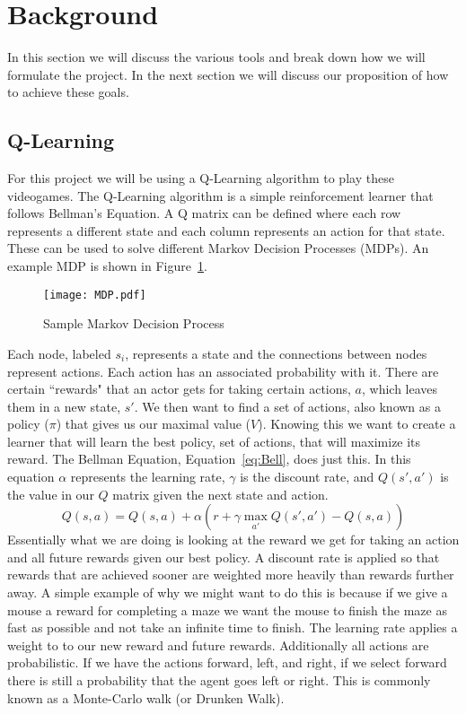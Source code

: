 \section{Background}
In this section we will discuss the various tools and break down how we will
formulate the project. In the next section we will discuss our proposition of
how to achieve these goals.

\subsection{Q-Learning}
For this project we will be using a Q-Learning algorithm to play these
videogames. The Q-Learning algorithm is a simple reinforcement learner that
follows Bellman's Equation. A Q matrix can be defined where each row represents
a different state and each column represents an action for that state. These
can be used to solve different Markov Decision Processes (MDPs). An example
MDP is shown in Figure~\ref{fig:MDP}.

\begin{figure}[ht]
    \centering
    \texttt{[image: MDP.pdf]}
\caption{Sample Markov Decision Process}
    \label{fig:MDP}
\end{figure}
Each node, labeled $s_i$, represents a state and the connections between nodes
represent actions. Each action has an associated probability with it. There 
are certain ``rewards" that an actor gets for taking certain actions, $a$, which
leaves them in a new state, $s'$. We then want to find a set of actions, also
known as a policy ($\pi$) that gives us our maximal value ($V$). Knowing this
we want to create a learner that will learn the best policy, set of actions,
that will maximize its reward. The Bellman Equation, Equation~\ref{eq:Bell}, 
does just this. In this equation $\alpha$ represents the learning rate, 
$\gamma$ is the discount rate, and $Q(s',a')$ is the value in our $Q$ matrix
given the next state and action.
\begin{equation}
    Q(s,a) = Q(s,a) + \alpha(r + \gamma \max_{a'}Q(s',a') - Q(s,a))
    \label{eq:Bell}
\end{equation}
Essentially what we are doing is looking at the reward we get for taking an 
action and all future rewards given our best policy. A discount rate is 
applied so that rewards that are achieved sooner are weighted more heavily
than rewards further away. A simple example of why we might want to do this
is because if we give a mouse a reward for completing a maze we want the mouse
to finish the maze as fast as possible and not take an infinite time to finish.
The learning rate applies a weight to to our new reward and future rewards. 
Additionally all actions are probabilistic. If we have the actions forward,
left, and right, if we select forward there is still a probability that the
agent goes left or right. This is commonly known as a Monte-Carlo walk (or
Drunken Walk). 

